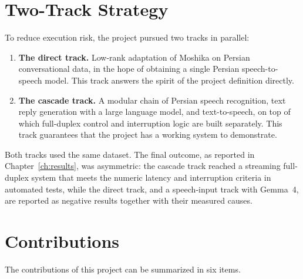 \section{Two-Track Strategy}
\label{sec:two-track}

To reduce execution risk, the project pursued two tracks in parallel:

\begin{enumerate}
\item \textbf{The direct track.} Low-rank adaptation of Moshika on Persian
      conversational data, in the hope of obtaining a single Persian
      speech-to-speech model. This track answers the spirit of the project
      definition directly.
\item \textbf{The cascade track.} A modular chain of Persian speech recognition,
      text reply generation with a large language model, and text-to-speech, on
      top of which full-duplex control and interruption logic are built
      separately. This track guarantees that the project has a working system to
      demonstrate.
\end{enumerate}

Both tracks used the same dataset. The final outcome, as reported in
Chapter~\ref{ch:results}, was asymmetric: the cascade track reached a streaming
full-duplex system that meets the numeric latency and interruption criteria in
automated tests, while the direct track, and a speech-input track with Gemma~4,
are reported as negative results together with their measured causes.

\section{Contributions}
\label{sec:contributions}

The contributions of this project can be summarized in six items.

